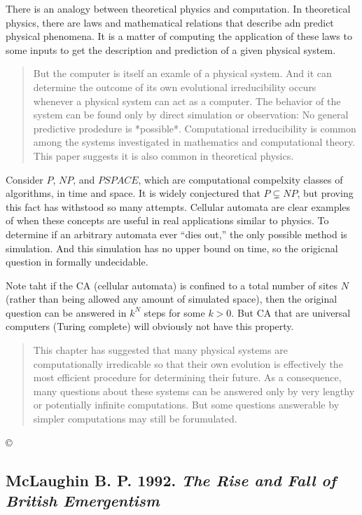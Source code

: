 \documentclass{article}
\newcommand{\ti}[1]{\textit{#1}}
\newcommand{\annbibtitle}[2]{\subsection*{#1. \ti{#2}}}
\begin{document}
There is an analogy between theoretical physics and computation. In theoretical physics, there are laws and mathematical relations that describe adn predict physical phenomena. It is a matter of computing the application of these laws to some inputs to get the description and prediction of a given physical system.

\begin{quote}
But the computer is itself an examle of a physical system. And it can determine the outcome of its own evolutional irreducibility occurs whenever a physical system can act as a computer. The behavior of the system can be found only by direct simulation or observation: No general predictive prodedure is *possible*. Computational irreducibility is common among the systems investigated in mathematics and computational theory. This paper suggests it is also common in theoretical physics.
\end{quote}

Consider $P$, $NP$, and $PSPACE$, which are computational compelxity classes of algorithms, in time and space. It is widely conjectured that $P \subsetneq NP$, but proving this fact has withstood so many attempts. Cellular automata are clear examples of when these concepts are useful in real applications similar to physics. To determine if an arbitrary automata ever ``dies out,'' the only possible method is simulation. And this simulation has no upper bound on time, so the origicnal question in formally undecidable.

Note taht if the CA (cellular automata) is confined to a total number of sites $N$ (rather than being allowed any amount of simulated space), then the original question can be answered in $k^N$ steps for some $k > 0$. But CA that are universal computers (Turing complete) will obviously not have this property.

\begin{quote}
This chapter has suggested that many physical systems are computationally irredicable so that their own evolution is effectively the most efficient procedure for determining their future. As a consequence, many questions about these systems can be answered only by very lengthy or potentially infinite computations. But some questions answerable by simpler computations may still be forumulated.
\end{quote}
©
\annbibtitle{McLaughin B. P. 1992}{The Rise and Fall of British Emergentism}
\end{document}
